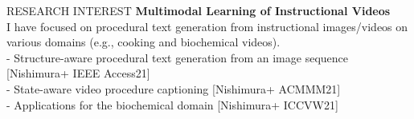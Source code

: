 \begin{rSection}{RESEARCH INTEREST}
{\bf Multimodal Learning of Instructional Videos}
\\
I have focused on procedural text generation from instructional images/videos on various domains (e.g., cooking and biochemical videos). \\
- Structure-aware procedural text generation from an image sequence [Nishimura+ IEEE Access21] \\
- State-aware video procedure captioning [Nishimura+ ACMMM21] \\
- Applications for the biochemical domain [Nishimura+ ICCVW21]
\end{rSection}